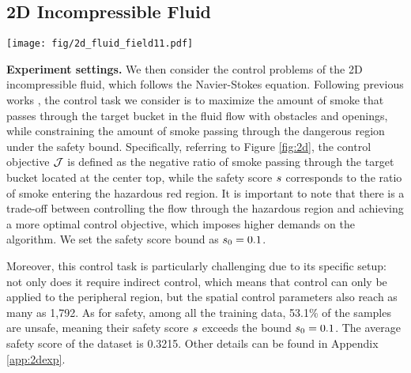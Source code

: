 \subsection{2D Incompressible Fluid}
\begin{figure*}[t]
\begin{center}
    \texttt{[image: fig/2d\_fluid\_field11.pdf]}
\end{center}
\vspace{-10pt}
\caption{\textbf{Visualization of the 2D incompressible fluid control by our \proj.} By controlling the fluid on the outside margin, the yellow smoke is successfully maneuvered to the center top exit while avoiding the red unsafe region.}
\vspace{-10pt}
\label{fig:2d}
\end{figure*}


\textbf{Experiment settings.} We then consider the control problems of the 2D incompressible fluid, which follows the Navier-Stokes equation. Following previous works \citep{holl2020learning, wei2024generative, hu2024wavelet}, the control task we consider is to maximize the amount of smoke that passes through the target bucket in the fluid flow with obstacles and openings, while constraining the amount of smoke passing through the dangerous region under the safety bound. Specifically, referring to Figure \ref{fig:2d}, the control objective \( \mathcal{J} \) is defined as the negative ratio of smoke passing through the target bucket located at the center top, while the safety score \( s \) corresponds to the ratio of smoke entering the hazardous red region. It is important to note that there is a trade-off between controlling the flow through the hazardous region and achieving a more optimal control objective, which imposes higher demands on the algorithm. We set the safety score bound as \( s_0 = 0.1 \).

Moreover, this control task is particularly challenging due to its specific setup: not only does it require indirect control, which means that control can only be applied to the peripheral region, but the spatial control parameters also reach as many as 1,792. As for safety, among all the training data, 53.1\% of the samples are unsafe, meaning their safety score \(s\) exceeds the bound \(s_0 = 0.1\). The average safety score of the dataset is 0.3215. Other details can be found in Appendix \ref{app:2dexp}.

